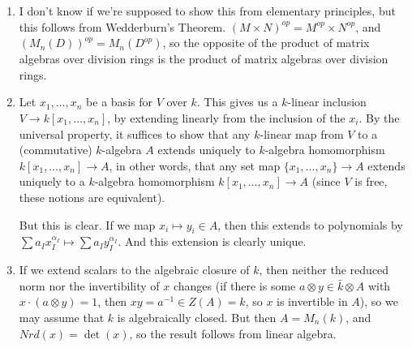\documentclass{article}
\begin{document}
\begin{enumerate}
   \item I don't know if we're supposed to show this from elementary principles,
      but this follows from Wedderburn's Theorem. $(M \times N)^{op} = M^{op}
      \times N^{op}$, and $(M_n(D))^{op} = M_n(D^{op})$, so the opposite of the
      product of matrix algebras over division rings is the product of matrix
      algebras over division rings.

   \item Let $x_1,\dotsc,x_n$ be a basis for $V$ over $k$. This gives us a
      $k$-linear inclusion $V \to k[x_1,\dotsc,x_n]$, by extending linearly from
      the inclusion of the $x_i$. By the universal property, it suffices to show
      that any $k$-linear map from $V$ to a (commutative) $k$-algebra $A$
      extends uniquely to $k$-algebra homomorphism $k[x_1,\dotsc,x_n] \to A$, in
      other words, that any set map $\{x_1,\dotsc,x_n\} \to A$ extends uniquely
      to a $k$-algebra homomorphism $k[x_1,\dotsc,x_n] \to A$ (since $V$ is
      free, these notions are equivalent). 

      But this is clear. If we map $x_i \mapsto y_i \in A$, then this extends to
      polynomials by $\sum a_Ix_I^{\alpha_I} \mapsto \sum a_Iy_I^{\alpha_I}$.
      And this extension is clearly unique.

   \item If we extend scalars to the algebraic closure of $k$, then neither the
      reduced norm nor the invertibility of $x$ changes (if there is some $a
      \otimes y \in \bar k \otimes A$ with $x \cdot (a \otimes y) = 1$, then $xy
      = a^{-1} \in Z(A) = k$, so $x$ is invertible in $A$), so we may assume
      that $k$ is algebraically closed. But then $A = M_n(k)$, and $Nrd(x) =
      \det(x)$, so the result follows from linear algebra.

\end{enumerate}
\end{document}
